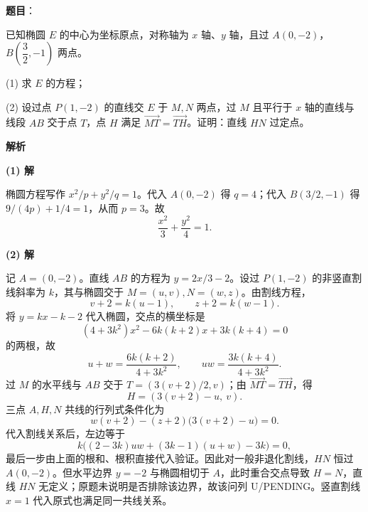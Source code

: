 \begin{answer}

\textbf{题目}：

已知椭圆 $E$ 的中心为坐标原点，对称轴为 $x$ 轴、$y$ 轴，且过 $A(0,-2)$，$B\left(\dfrac32,-1\right)$ 两点。

(1) 求 $E$ 的方程；

(2) 设过点 $P(1,-2)$ 的直线交 $E$ 于 $M,N$ 两点，过 $M$ 且平行于 $x$ 轴的直线与线段 $AB$ 交于点 $T$，点 $H$ 满足 $\overrightarrow{MT}=\overrightarrow{TH}$。证明：直线 $HN$ 过定点。

\textbf{解析}

\textbf{(1) 解}

椭圆方程写作 $x^2/p+y^2/q=1$。代入 $A(0,-2)$ 得 $q=4$；代入 $B(3/2,-1)$ 得 $9/(4p)+1/4=1$，从而 $p=3$。故
\nopagebreak[4]
\[
\frac{x^2}{3}+\frac{y^2}{4}=1.
\]

\textbf{(2) 解}

记 $A=(0,-2)$。直线 $AB$ 的方程为 $y=2x/3-2$。设过 $P(1,-2)$ 的非竖直割线斜率为 $k$，其与椭圆交于 $M=(u,v),N=(w,z)$。由割线方程，
\nopagebreak[4]
\[
v+2=k(u-1),\qquad z+2=k(w-1).
\]
将 $y=kx-k-2$ 代入椭圆，交点的横坐标是
\nopagebreak[4]
\[
(4+3k^2)x^2-6k(k+2)x+3k(k+4)=0
\]
的两根，故
\nopagebreak[4]
\[
u+w=\frac{6k(k+2)}{4+3k^2},\qquad
uw=\frac{3k(k+4)}{4+3k^2}.
\]
过 $M$ 的水平线与 $AB$ 交于 $T=(3(v+2)/2,v)$；由 $\overrightarrow{MT}=\overrightarrow{TH}$，得
\nopagebreak[4]
\[
H=(3(v+2)-u,\ v).
\]
三点 $A,H,N$ 共线的行列式条件化为
\nopagebreak[4]
\[
w(v+2)-(z+2)\bigl(3(v+2)-u\bigr)=0.
\]
代入割线关系后，左边等于
\nopagebreak[4]
\[
k\bigl((2-3k)uw+(3k-1)(u+w)-3k\bigr)=0,
\]
最后一步由上面的根和、根积直接代入验证。因此对一般非退化割线，$HN$ 恒过 $A(0,-2)$。但水平边界 $y=-2$ 与椭圆相切于 $A$，此时重合交点导致 $H=N$，直线 $HN$ 无定义；原题未说明是否排除该边界，故该问列 U/PENDING。竖直割线 $x=1$ 代入原式也满足同一共线关系。



\end{answer}

